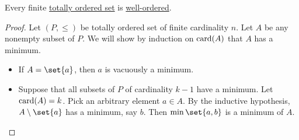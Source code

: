 \begin{proposition}\label{thm:finite_totally_ordered_set_is_well_ordered}
  Every finite \hyperref[def:totally_ordered_set]{totally ordered set} is \hyperref[def:well_ordered_set]{well-ordered}.
\end{proposition}
\begin{proof}
  Let \( (P, \leq) \) be totally ordered set of finite cardinality \( n \). Let \( A \) be any nonempty subset of \( P \). We will show by induction on \( \operatorname{card}(A) \) that \( A \) has a minimum.

  \begin{itemize}
    \item If \( A = \set{ a } \), then \( a \) is vacuously a minimum.
    \item Suppose that all subsets of \( P \) of cardinality \( k - 1 \) have a minimum. Let \( \operatorname{card}(A) = k \). Pick an arbitrary element \( a \in A \). By the inductive hypothesis, \( A \setminus \set{ a } \) has a minimum, say \( b \). Then \( \min\set{ a, b } \) is a minimum of \( A \).
  \end{itemize}
\end{proof}

